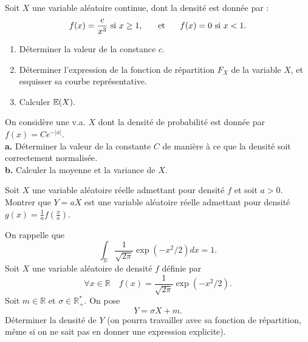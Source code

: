 \bigskip

\begin{exo} Soit $X$ une variable aléatoire continue, dont la densité est donnée par :
$$f(x)={c\over x^3} \mbox{ si } x\geq 1, \hspace{0.5cm} \mbox{ et } \hspace{0.5cm} f(x)=0 \mbox{ si } x<1.$$
\begin{enumerate}
\item D\'eterminer la valeur de la constance $c$.
\item Déterminer l'expression de la fonction de répartition $F_X$ de la variable $X$, et esquisser sa courbe représentative.
\item Calculer $\mathbb E(X).$
\end{enumerate}
\end{exo}

\bigskip

\begin{exo} On consid\`ere une v.a. $X$ dont la densit\'e de probabilit\'e est donn\'ee par $f(x)=Ce^{-|x|}$.\\
\noindent\textbf{a.} D\'eterminer la valeur de la constante $C$ de mani\`ere \`a ce que la densit\'e soit correctement normalis\'ee.\\
\noindent\textbf{b.} Calculer la moyenne et la variance de $X$.
\end{exo}

\bigskip

\begin{exo}
Soit $X$ une variable al{\'e}atoire r{\'e}elle admettant pour densit{\'e} $f$ et soit $a>0$.
Montrer que $Y=aX$ est une variable al{\'e}atoire r{\'e}elle admettant pour 
densit{\'e} $g(x)=\frac{1}{a} f(\frac{x}{a})$.
\end{exo}

\bigskip

\begin{exo}
On rappelle que
$$\int_{\mathbb R} \frac{1}{\sqrt{2\pi}} \exp(-x^2/2) dx=1.$$
Soit $X$ une variable al\'eatoire de densit\'e $f$ d\'efinie par
$$\forall x \in \mathbb R \quad f(x)=\frac{1}{\sqrt{2\pi}} \exp(-x^2/2).$$
Soit $m \in \mathbb R$ et $\sigma \in \mathbb R_+^*$. On pose 
$$Y=\sigma X +m.$$
D\'eterminer la densit\'e de $Y$ (on pourra travailler avec sa fonction de r\'epartition, m\^eme si on ne sait pas en donner une expression explicite).
\end{exo}

\bigskip

